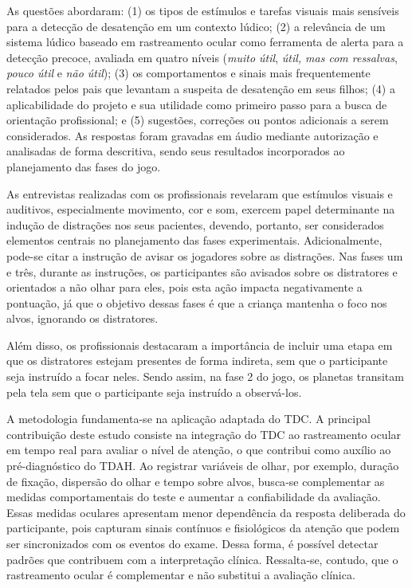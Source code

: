 \documentclass[11pt,a4paper]{article}
\begin{document}
As questões abordaram: (1) os tipos de estímulos e tarefas visuais mais sensíveis para a detecção de desatenção em um contexto lúdico; (2) a relevância de um sistema lúdico baseado em rastreamento ocular como ferramenta de alerta para a detecção precoce, avaliada em quatro níveis (\textit{muito útil}, \textit{útil, mas com ressalvas}, \textit{pouco útil} e \textit{não útil}); (3) os comportamentos e sinais mais frequentemente relatados pelos pais que levantam a suspeita de desatenção em seus filhos; (4) a aplicabilidade do projeto e sua utilidade como primeiro passo para a busca de orientação profissional; e (5) sugestões, correções ou pontos adicionais a serem considerados. As respostas foram gravadas em áudio mediante autorização e analisadas de forma descritiva, sendo seus resultados incorporados ao planejamento das fases do jogo.

As entrevistas realizadas com os profissionais revelaram que estímulos visuais e auditivos, especialmente movimento, cor e som, exercem papel determinante na indução de distrações nos seus pacientes, devendo, portanto, ser considerados elementos centrais no planejamento das fases experimentais. Adicionalmente, pode-se citar a instrução de avisar os jogadores sobre as distrações. Nas fases um e três, durante as instruções, os participantes são avisados sobre os distratores e orientados a não olhar para eles, pois esta ação impacta negativamente a pontuação, já que o objetivo dessas fases é que a criança mantenha o foco nos alvos, ignorando os distratores.

Além disso, os profissionais destacaram a importância de incluir uma etapa em que os distratores estejam presentes de forma indireta, sem que o participante seja instruído a focar neles. Sendo assim, na fase 2 do jogo, os planetas transitam pela tela sem que o participante seja instruído a observá-los.

A metodologia fundamenta-se na aplicação adaptada do TDC. A principal contribuição deste estudo consiste na integração do TDC ao rastreamento ocular em tempo real para avaliar o nível de atenção, o que contribui como auxílio ao pré-diagnóstico do TDAH. Ao registrar variáveis de olhar, por exemplo, duração de fixação, dispersão do olhar e tempo sobre alvos, busca‑se complementar as medidas comportamentais do teste e aumentar a confiabilidade da avaliação. Essas medidas oculares apresentam menor dependência da resposta deliberada do participante, pois capturam sinais contínuos e fisiológicos da atenção que podem ser sincronizados com os eventos do exame. Dessa forma, é possível detectar padrões que contribuem com a interpretação clínica. Ressalta‑se, contudo, que o rastreamento ocular é complementar e não substitui a avaliação clínica.
\end{document}
